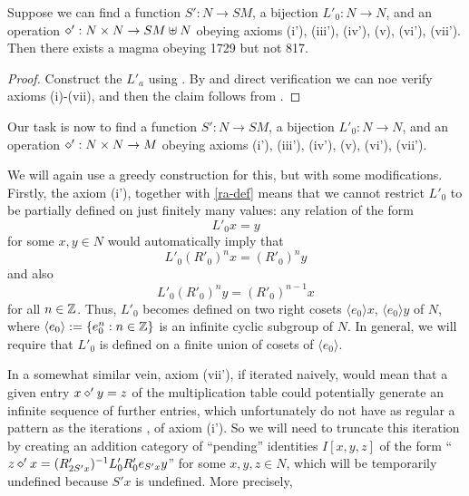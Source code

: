 \begin{lemma}\label{axiom-reduce}\label{Eq1729.reduce_to_new_axioms}\leanok  Suppose we can find a function $S': N \to SM$, a bijection $L'_0: N \to N$, and an operation $\diamond': N \times N \to SM \uplus N$ obeying axioms (i'), (iii'), (iv'), (v), (vi'), (vii').  Then there exists a magma obeying 1729 but not 817.
\end{lemma}

\begin{proof}\leanok  Construct the $L'_a$ using .  By  and direct verification we can noe verify axioms (i)-(vii), and then the claim follows from .
\end{proof}

Our task is now to find a function $S': N \to SM$, a bijection $L'_0: N \to N$, and an operation $\diamond': N \times N \to M$ obeying axioms (i'), (iii'), (iv'), (v), (vi'), (vii').

We will again use a greedy construction for this, but with some modifications.  Firstly, the axiom (i'), together with \eqref{ra-def} means that we cannot restrict $L'_0$ to be partially defined on just finitely many values: any relation of the form
$$ L'_0 x = y$$
for some $x,y \in N$ would automatically imply that
\begin{equation}\label{itero}
 L'_0 (R'_0)^n x = (R'_0)^n y
\end{equation}
and also
\begin{equation}\label{itero-2}
  L'_0 (R'_0)^n y = (R'_0)^{n-1} x
\end{equation}
for all $n \in \mathbb{Z}$.  Thus, $L'_0$ becomes defined on two right cosets $\langle e_0 \rangle x$, $\langle e_0 \rangle y$ of $N$, where $\langle e_0 \rangle := \{ e_0^n: n \in \mathbb{Z}\}$ is an infinite cyclic subgroup of $N$.  In general, we will require that $L'_0$ is defined on a finite union of cosets of $\langle e_0\rangle$.

In a somewhat similar vein, axiom (vii'), if iterated naively, would mean that a given entry $x \diamond' y = z$ of the multiplication table could potentially generate an infinite sequence of further entries, which unfortunately do not have as regular a pattern as the iterations ,  of axiom (i').  So we will need to truncate this iteration by creating an addition category of ``pending'' identities $I[x,y,z]$ of the form ``$z \diamond' x = (R'_{2S'x})^{-1} L'_0 R'_0 e_{S'x} y$'' for some $x,y,z \in N$, which will be temporarily undefined because $S'x$ is undefined. More precisely,

